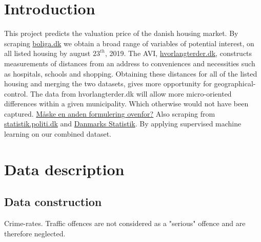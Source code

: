 \documentclass[12pt,a4paper]{article}
\begin{document}

\newpage
\onehalfspacing

\tableofcontents
\newpage
\section{Introduction}
This project predicts the valuation price of the danish housing market. By scraping \href{https://www.boliga.dk}{boliga.dk} we obtain a broad range of variables of potential interest, on all listed housing by august $23^{th}$, 2019. The AVI, \href{https://www.hvorlangterder.dk}{hvorlangterder.dk}, constructs measurements of distances from an address to conveniences and necessities such as hospitals, schools and shopping. Obtaining these distances for all of the listed housing and merging the two datasets, gives more opportunity for geographical-control. The data from hvorlangterder.dk will allow more micro-oriented differences within a given municipality. Which otherwise would not have been captured.  
\newline \underline{Måske en anden formulering ovenfor?}
Also scraping from  \href{https://statistik.politi.dk/QvAJAXZfc/opendoc.htm?document=QlikApplication%2F2999_Public\%2FPublic_IndsatsResultater.qvw}{statistik.politi.dk} and 
\href{https://www.dst.dk/da/Statistik/emner/befolkning-og-valg}{Danmarks Statistik}. 
By applying supervised machine learning on our combined dataset.  
\section{Data description}
\subsection{Data construction}
Crime-rates. Traffic offences are not considered as a "serious" offence and are therefore neglected. 
\end{document}
